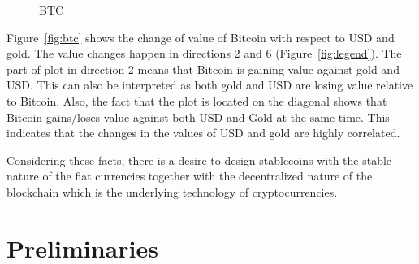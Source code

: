 
\begin{figure}[!htb]
	\centering
	\hfill
	\caption{BTC}
	\label{fig:Comparison}
\end{figure}


Figure~\ref{fig:btc} shows the change of value of Bitcoin with respect to USD and gold. The value changes happen in directions 2 and 6 (Figure~\ref{fig:legend}). The part of plot in direction 2 means that Bitcoin is gaining value against gold and USD. This can also be interpreted as both gold and USD are losing value relative to Bitcoin. %
Also, the fact that the plot is located on the diagonal shows that Bitcoin gains/loses value against both USD and Gold at the same time. This indicates that the changes in the values of USD and gold are highly correlated.

Considering these facts, there is a desire to design stablecoins with the stable nature of the fiat currencies together with the decentralized nature of the blockchain which is the underlying technology of cryptocurrencies.


\section{Preliminaries}

